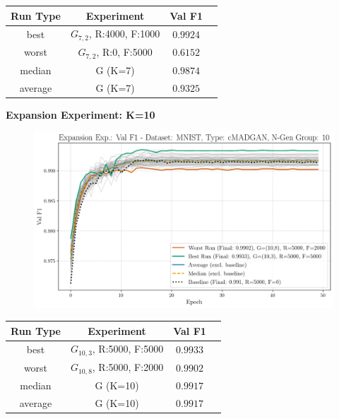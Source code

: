 \begin{table}[H]
	\vspace{-1em}
	\centering
	\begin{tabular}{|c|c|c|c|}
		\hline
		Run Type & Experiment & Val F1 \\ \hline
		best & \(G_{7, 2}\), R:4000, F:1000 & $0.9924$\\ \hline
		worst & \(G_{7, 2}\), R:0, F:5000 & $0.6152$\\ \hline
		median & G (K=7) & $0.9874$\\ \hline
		average & G (K=7) & $0.9325$
		\\ \hline
	\end{tabular}
\end{table}
\newpage
\noindent\textbf{Expansion Experiment: K=10}
\begin{figure}[htbp]
	\centering
	\includegraphics[width=.85\textwidth]{abb/strat_classifier_performance/MNIST_STRATIFIED_CLASSIFIERS_cMADGAN_NEW/expansion_experiments/val_f1_score_cMADGAN_MNIST_n_gen_10_all.png}
	\label{fig:app_strat_class_performance_expansion_exp._val_f1_score_10}
\end{figure}
\begin{table}[H]
	\vspace{-1em}
	\centering
	\begin{tabular}{|c|c|c|c|}
		\hline
		Run Type & Experiment & Val F1 \\ \hline
		best & \(G_{10, 3}\), R:5000, F:5000 & $0.9933$\\ \hline
		worst & \(G_{10, 8}\), R:5000, F:2000 & $0.9902$\\ \hline
		median & G (K=10) & $0.9917$\\ \hline
		average & G (K=10) & $0.9917$
		\\ \hline
	\end{tabular}
\end{table}
